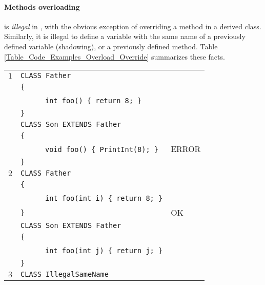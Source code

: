 \documentclass{article}
\begin{document}
\paragraph{Methods overloading} is \textit{illegal} in \plname,
with the obvious exception of overriding a method in a derived class.
Similarly, it is illegal to define a variable with the same name of
a previously defined variable (shadowing), or a previously defined method.
Table \ref{Table_Code_Examples_Overload_Override} summarizes these facts.
\begin{table}[h]
\centering
\begin{tabular}{|l|l|l|}
\hline
 $1$ & \verb"CLASS Father"                       &       \\
     & \verb"{"                                  &       \\
     & ~ ~ ~ ~\verb"int foo() { return 8; }"     &       \\
     & \verb"}"                                  &       \\
     & \verb"CLASS Son EXTENDS Father"           &       \\
     & \verb"{"                                  &       \\
     & ~ ~ ~ ~\verb"void foo() { PrintInt(8); }" & ERROR \\
     & \verb"}"                                  &       \\
\hline
 $2$ & \verb"CLASS Father"                        &    \\
     & \verb"{"                                   &    \\
     & ~ ~ ~ ~\verb"int foo(int i) { return 8; }" &    \\
     & \verb"}"                                   & OK \\
     & \verb"CLASS Son EXTENDS Father"            &    \\
     & \verb"{"                                   &    \\
     & ~ ~ ~ ~\verb"int foo(int j) { return j; }" &    \\
     & \verb"}"                                   &    \\
\hline
 $3$ & \verb"CLASS IllegalSameName"                   &       \\

\end{tabular}
\end{table}
\end{document}
